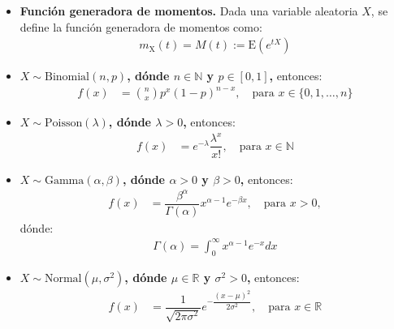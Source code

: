 \documentclass[8pt]{article}
\begin{document}
\begin{itemize}
    \item \textbf{Función generadora de momentos.} Dada una variable aleatoria $X$, se define la función generadora de momentos como:
    \begin{align*}
        m_{\text{X}}(t) = M(t) := \text{E}(e^{tX})
    \end{align*}

    \item \textbf{$X \sim \text{Binomial}(n, p)$, dónde $n \in \mathbb{N}$ y $p \in [0, 1]$,} entonces:
    \begin{align*}
        f(x) &= \binom{n}{x} p^x (1-p)^{n-x}, \quad \text{para } x \in \{0, 1, \ldots, n\}
    \end{align*}

    \item \textbf{$X \sim \text{Poisson}(\lambda)$, dónde $\lambda > 0$,} entonces:
    \begin{align*}
        f(x) &= e^{-\lambda} \dfrac{\lambda^x}{x!}, \quad \text{para } x \in \mathbb{N}
    \end{align*}

    \item \textbf{$X \sim \text{Gamma}(\alpha, \beta)$, dónde $\alpha > 0$ y $\beta > 0$,} entonces:
    \begin{align*}
        f(x) &= \dfrac{\beta^\alpha}{\Gamma(\alpha)} x^{\alpha-1} e^{-\beta x}, \quad \text{para } x > 0,
    \end{align*}
    dónde:
    \begin{align*}
        \Gamma(\alpha) = \int_0^{\infty} x^{\alpha-1} e^{-x} dx
    \end{align*}

    \item \textbf{$X \sim \text{Normal}(\mu, \sigma^2)$, dónde $\mu \in \mathbb{R}$ y $\sigma^2 > 0$,} entonces:
    \begin{align*}
        f(x) &= \dfrac{1}{\sqrt{2\pi\sigma^2}} e^{-\dfrac{(x-\mu)^2}{2\sigma^2}}, \quad \text{para } x \in \mathbb{R}
    \end{align*}
\end{itemize}
\end{document}
